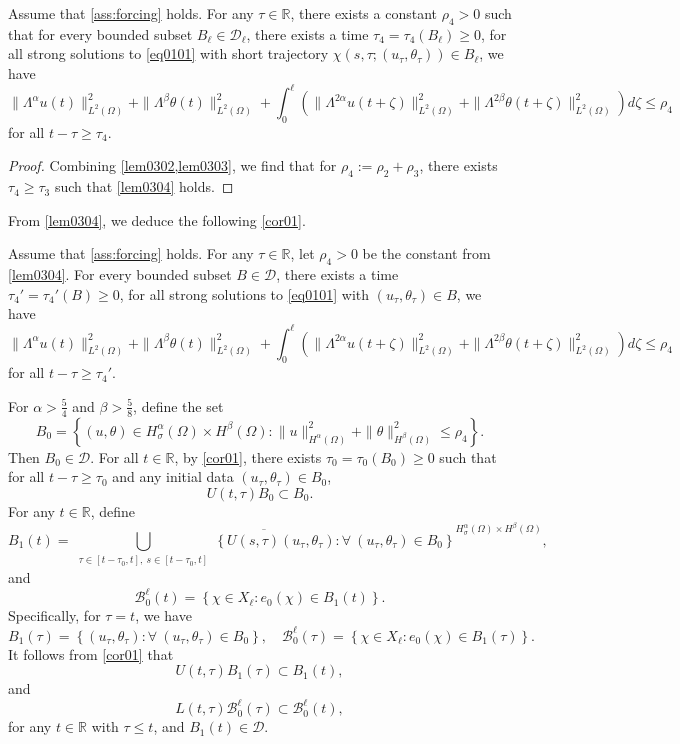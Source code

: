 \documentclass[oneside,preprint,12pt,numbers,sort&compress]{elsarticle}
\begin{document}
\begin{lemma}\label{lem0304}
Assume that \cref{ass:forcing} holds. For any $\tau \in \mathbb{R}$, there exists a constant $\rho_{4}>0$ such that for every bounded subset $B_{\ell} \in \mathcal{D}_{\ell}$, there exists a time $\tau_4 =\tau_4(B_{\ell}) \geq 0 $, for all strong solutions to \cref{eq0101} with short trajectory $\chi(s,\tau; (u_\tau, \theta_\tau)) \in B_{\ell}$, we have 
\[
\| \Lambda^{\alpha} u(t)\|_{L^2(\Omega)}^{2}
+ \| \Lambda^{\beta} \theta(t)\|_{L^2(\Omega)}^{2}
+ \int_{0}^{\ell}\left( \| \Lambda^{2\alpha} u(t+\zeta) \|_{L^2(\Omega)}^{2} + \| \Lambda^{2\beta} \theta(t+\zeta) \|_{L^2(\Omega)}^{2} \right)  d\zeta 
\leq \rho_{4}
\]
for all $t-\tau \geq \tau_{4}$.
\end{lemma}
\begin{proof}
Combining \cref{lem0302,lem0303}, we find that for $\rho_{4}:=\rho_{2}+\rho_{3}$, there exists $\tau_{4} \geq \tau_{3}$ such that \cref{lem0304} holds.
\end{proof}

From \cref{lem0304}, we deduce the following \cref{cor01}.

\begin{corollary}\label{cor01}
Assume that \cref{ass:forcing} holds. For any $\tau \in \mathbb{R}$, let $\rho_{4}>0$ be the constant from \cref{lem0304}. For every bounded subset $B \in \mathcal{D}$, there exists a time $\tau_4' =\tau_4'(B) \geq 0 $, for all strong solutions to \cref{eq0101} with $ (u_\tau, \theta_\tau) \in B$, we have 
\[
\| \Lambda^{\alpha} u(t)\|_{L^2(\Omega)}^{2}
+ \| \Lambda^{\beta} \theta(t)\|_{L^2(\Omega)}^{2}
+ \int_{0}^{\ell}\left( \| \Lambda^{2\alpha} u(t+\zeta) \|_{L^2(\Omega)}^{2} + \| \Lambda^{2\beta} \theta(t+\zeta) \|_{L^2(\Omega)}^{2} \right)  d\zeta 
\leq \rho_{4}
\]
for all $t-\tau \geq \tau_4'$.
\end{corollary}

For $\alpha>\frac{5}{4}$ and $\beta>\frac{5}{8}$, define the set
\[
B_0 = \left\{ (u, \theta) \in H_\sigma^{\alpha}(\Omega) \times H^\beta(\Omega) : \|u\|_{H^{\alpha}(\Omega)}^2 + \|\theta\|_{H^\beta(\Omega)}^2 \leq \rho_4 \right\}.
\]
Then \( B_0 \in \mathcal{D} \). For all $t \in \mathbb{R}$, by \cref{cor01}, there exists \( \tau_0 = \tau_0(B_0) \geq 0 \) such that for all \( t - \tau \geq \tau_0 \) and any initial data \( (u_\tau, \theta_\tau) \in B_0 \),  
\[
U(t, \tau) B_0 \subset B_0.
\]
For any $t\in \mathbb{R}$, define
\[
B_1(t) = \overline{\bigcup_{\substack{\tau \in [t - \tau_0, t],\ s \in [t - \tau_0, t]}} \left\{ U(s, \tau)(u_\tau, \theta_\tau) : \forall\ (u_\tau, \theta_\tau) \in B_0 \right\}}^{H_\sigma^{\alpha}(\Omega) \times H^{\beta}(\Omega)},
\]
and
\[
\mathcal{B}_0^\ell(t) = \left\{ \chi \in X_\ell : e_0(\chi) \in B_1(t) \right\}.
\]
Specifically, for $\tau = t$, we have 
$$
B_1(\tau) = \left\{ (u_\tau, \theta_\tau) : \forall\ (u_\tau, \theta_\tau) \in B_0 \right\},\quad
\mathcal{B}_0^\ell(\tau) = \left\{ \chi \in X_\ell : e_0(\chi) \in B_1(\tau) \right\}.
$$
It follows from \cref{cor01} that
\[
U(t, \tau) B_1(\tau) \subset B_1(t),
\]
and
\[
L(t, \tau) \mathcal{B}_0^\ell(\tau) \subset \mathcal{B}_0^\ell(t),
\]
for any $t \in \mathbb{R}$ with $\tau \leq t$, and $B_1(t) \in \mathcal{D}$.
\end{document}
